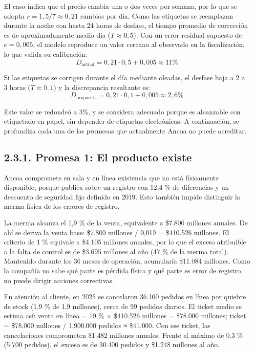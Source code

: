 \documentclass[11pt]{article}
\begin{document}
El caso indica que el precio cambia una o dos veces por semana, por lo que se adopta $r = 1{,}5/7 \approx 0{,}21$ cambios por día. Como las etiquetas se reemplazan durante la noche con hasta 24 horas de desfase, el tiempo promedio de corrección es de aproximadamente medio día ($T \approx 0{,}5$). Con un error residual supuesto de $e = 0{,}005$, el modelo reproduce un valor cercano al observado en la fiscalización, lo que valida su calibración:
\[
D_{\text{actual}} = 0{,}21 \cdot 0{,}5 + 0{,}005 \approx 11\%
\]

Si las etiquetas se corrigen durante el día mediante oleadas, el desfase baja a 2 a 3 horas ($T \approx 0{,}1$) y la discrepancia resultante es:
\[
D_{\text{propuesta}} = 0{,}21 \cdot 0{,}1 + 0{,}005 \approx 2{,}6\%
\]

Este valor se redondeó a 3\%, y se considera adecuado porque es alcanzable con etiquetado en papel, sin depender de etiquetas electrónicas. A continuación, se profundiza cada una de las promesas que actualmente Ancoa no puede acreditar.

\subsection{2.3.1. Promesa 1: El producto existe}\label{promesa-1-el-producto-existe}

Ancoa compromete en sala y en línea existencia que no está físicamente disponible, porque publica sobre un registro con 12,4 \% de diferencias y un descuento de seguridad fijo definido en 2019. Esto también impide distinguir la merma física de los errores de registro.

La merma alcanza el 1,9 \% de la venta, equivalente a \$7.800 millones anuales. De ahí se deriva la venta base: \$7.800 millones / 0,019 = \$410.526 millones. El criterio de 1 \% equivale a \$4.105 millones anuales, por lo que el exceso atribuible a la falta de control es de \$3.695 millones al año (47 \% de la merma total). Mantenido durante los 36 meses de operación, acumularía \$11.084 millones. Como la compañía no sabe qué parte es pérdida física y qué parte es error de registro, no puede dirigir acciones correctivas.

En atención al cliente, en 2025 se cancelaron 36.100 pedidos en línea por quiebre de stock (1,9 \% de 1,9 millones), cerca de 99 pedidos diarios. El ticket medio se estima así: venta en línea = 19 \% × \$410.526 millones = \$78.000 millones; ticket = \$78.000 millones / 1.900.000 pedidos ≈ \$41.000. Con ese ticket, las cancelaciones comprometen \$1.482 millones anuales. Frente al máximo de 0,3 \% (5.700 pedidos), el exceso es de 30.400 pedidos y \$1.248 millones al año.
\end{document}
